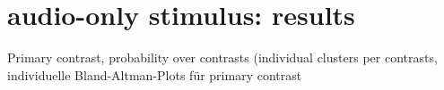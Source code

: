 \documentclass[english]{article}
\begin{document}


\section{audio-only stimulus: results}
Primary contrast, probability over contrasts (individual clusters per contrasts,
individuelle Bland-Altman-Plots für primary contrast
\end{document}
